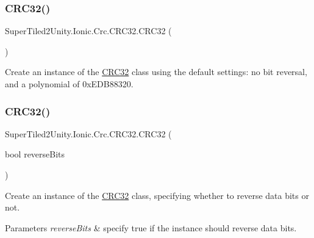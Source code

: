 \subsubsection{\texorpdfstring{C\+R\+C32()}{CRC32()}\hspace{0.1cm}{\footnotesize\ttfamily [1/3]}}
{\footnotesize\ttfamily Super\+Tiled2\+Unity.\+Ionic.\+Crc.\+C\+R\+C32.\+C\+R\+C32 (\begin{DoxyParamCaption}{ }\end{DoxyParamCaption})}



Create an instance of the \mbox{\hyperlink{class_super_tiled2_unity_1_1_ionic_1_1_crc_1_1_c_r_c32}{C\+R\+C32}} class using the default settings\+: no bit reversal, and a polynomial of 0x\+E\+D\+B88320. 

\mbox{\label{class_super_tiled2_unity_1_1_ionic_1_1_crc_1_1_c_r_c32_a08b8fd33fe8fb5840d9e20eecf878c67}} 
\subsubsection{\texorpdfstring{C\+R\+C32()}{CRC32()}\hspace{0.1cm}{\footnotesize\ttfamily [2/3]}}
{\footnotesize\ttfamily Super\+Tiled2\+Unity.\+Ionic.\+Crc.\+C\+R\+C32.\+C\+R\+C32 (\begin{DoxyParamCaption}\item[{bool}]{reverse\+Bits }\end{DoxyParamCaption})}



Create an instance of the \mbox{\hyperlink{class_super_tiled2_unity_1_1_ionic_1_1_crc_1_1_c_r_c32}{C\+R\+C32}} class, specifying whether to reverse data bits or not. 


\begin{DoxyParams}{Parameters}
{\em reverse\+Bits} & specify true if the instance should reverse data bits. \\
\hline
\end{DoxyParams}


